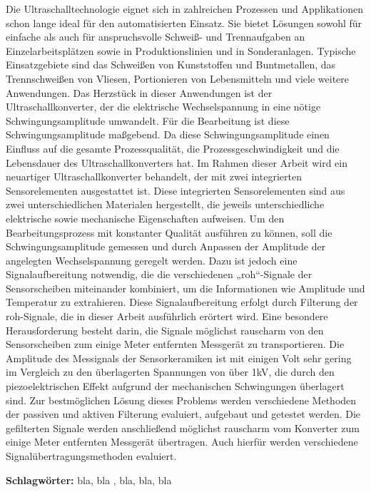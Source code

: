 \begin{kurzfassung}
Die Ultraschalltechnologie eignet sich in zahlreichen Prozessen und Applikationen schon lange ideal für den automatisierten Einsatz. Sie bietet Lösungen sowohl für einfache als auch für anspruchsvolle Schweiß- und Trennaufgaben an Einzelarbeitsplätzen sowie in Produktionslinien und in Sonderanlagen. Typische Einsatzgebiete sind das Schweißen von Kunststoffen und Buntmetallen, das Trennschweißen von Vliesen, Portionieren von Lebensmitteln und viele weitere Anwendungen. Das Herzstück in dieser Anwendungen ist der Ultraschallkonverter, der die elektrische Wechselspannung in eine nötige Schwingungsamplitude umwandelt.  Für die Bearbeitung ist diese Schwingungsamplitude maßgebend. Da diese Schwingungsamplitude einen Einfluss auf die gesamte Prozessqualität, die Prozessgeschwindigkeit und die Lebensdauer des Ultraschallkonverters hat.
Im Rahmen dieser Arbeit wird ein neuartiger Ultraschallkonverter behandelt, der mit zwei integrierten Sensorelementen ausgestattet ist. Diese integrierten Sensorelementen sind aus zwei unterschiedlichen Materialen hergestellt, die jeweils unterschiedliche elektrische sowie mechanische Eigenschaften aufweisen.  Um den Bearbeitungsprozess mit konstanter Qualität ausführen zu können, soll die Schwingungsamplitude gemessen und durch Anpassen der Amplitude der angelegten Wechselspannung geregelt werden.
Dazu ist jedoch eine Signalaufbereitung notwendig, die die verschiedenen „roh“-Signale der Sensorscheiben miteinander kombiniert, um die Informationen wie Amplitude und Temperatur zu extrahieren. Diese Signalaufbereitung erfolgt durch Filterung der roh-Signale, die in dieser Arbeit ausführlich erörtert wird. 
Eine besondere Herausforderung besteht darin, die Signale möglichst rauscharm von den Sensorscheiben zum einige Meter entfernten Messgerät zu transportieren. Die Amplitude des Messignals der Sensorkeramiken ist mit einigen Volt sehr gering im Vergleich zu den überlagerten Spannungen von über 1kV, die durch den piezoelektrischen Effekt aufgrund der mechanischen Schwingungen überlagert sind. Zur bestmöglichen Lösung dieses Problems werden verschiedene Methoden der passiven und aktiven Filterung evaluiert, aufgebaut und getestet werden. Die gefilterten Signale werden anschließend möglichst rauscharm vom Konverter zum einige Meter entfernten Messgerät übertragen. Auch hierfür werden verschiedene Signalübertragungsmethoden evaluiert.
\vspace{1cm}


{\bfseries Schlagwörter:} bla, bla , bla, bla, bla

\end{kurzfassung}
